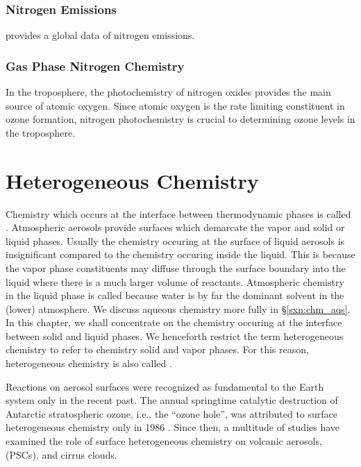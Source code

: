 \documentclass[12pt,twoside]{book}
\begin{document}
\subsection[Nitrogen Emissions]{Nitrogen Emissions}
\cite{BSP96} provides a global data of nitrogen emissions.

\subsection[Gas Phase Nitrogen Chemistry]{Gas Phase Nitrogen Chemistry}
In the troposphere, the photochemistry of nitrogen oxides provides the
main source of atomic oxygen.
Since atomic oxygen is the rate limiting constituent in ozone
formation, nitrogen photochemistry is crucial to determining ozone
levels in the troposphere.

\chapter{Heterogeneous Chemistry}\label{sxn:chm_htr}
Chemistry which occurs at the interface between thermodynamic 
phases is called . 
Atmospheric aerosols provide surfaces which demarcate the vapor and
solid or liquid phases.
Usually the chemistry occuring at the surface of liquid aerosols is
insignificant compared to the chemistry occuring inside the liquid.
This is because the vapor phase constituents may diffuse through the 
surface boundary into the liquid where there is a much larger volume
of reactants.
Atmospheric chemistry in the liquid phase is called  because water is by far the dominant solvent in the
(lower) atmosphere. 
We discuss aqueous chemistry more fully in \S\ref{sxn:chm_aqs}.
In this chapter, we shall concentrate on the chemistry occuring at the
interface between solid and liquid phases.
We henceforth restrict the term heterogeneous chemistry to refer to
chemistry solid and vapor phases.
For this reason, heterogeneous chemistry is also called
.

Reactions on aerosol surfaces were recognized as fundamental to the
Earth system only in the recent past. 
The annual springtime catalytic destruction of Antarctic stratospheric
ozone, i.e., the ``ozone hole'', was attributed to surface
heterogeneous chemistry only in 1986 \cite[][]{SGR86,MSW86}.
Since then, a multitude of studies have examined the role of surface
heterogeneous chemistry on volcanic aerosols,  (PSCs), and cirrus clouds.
\end{document}
